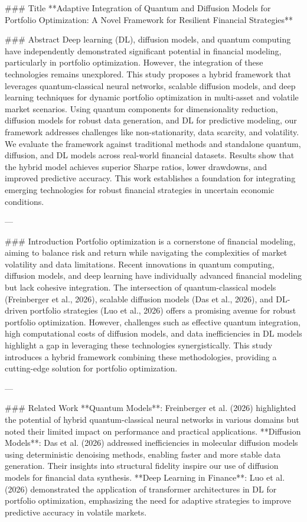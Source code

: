 ### Title  
**Adaptive Integration of Quantum and Diffusion Models for Portfolio Optimization: A Novel Framework for Resilient Financial Strategies**

### Abstract  
Deep learning (DL), diffusion models, and quantum computing have independently demonstrated significant potential in financial modeling, particularly in portfolio optimization. However, the integration of these technologies remains unexplored. This study proposes a hybrid framework that leverages quantum-classical neural networks, scalable diffusion models, and deep learning techniques for dynamic portfolio optimization in multi-asset and volatile market scenarios. Using quantum components for dimensionality reduction, diffusion models for robust data generation, and DL for predictive modeling, our framework addresses challenges like non-stationarity, data scarcity, and volatility. We evaluate the framework against traditional methods and standalone quantum, diffusion, and DL models across real-world financial datasets. Results show that the hybrid model achieves superior Sharpe ratios, lower drawdowns, and improved predictive accuracy. This work establishes a foundation for integrating emerging technologies for robust financial strategies in uncertain economic conditions.

---

### Introduction  
Portfolio optimization is a cornerstone of financial modeling, aiming to balance risk and return while navigating the complexities of market volatility and data limitations. Recent innovations in quantum computing, diffusion models, and deep learning have individually advanced financial modeling but lack cohesive integration. The intersection of quantum-classical models (Freinberger et al., 2026), scalable diffusion models (Das et al., 2026), and DL-driven portfolio strategies (Luo et al., 2026) offers a promising avenue for robust portfolio optimization. However, challenges such as effective quantum integration, high computational costs of diffusion models, and data inefficiencies in DL models highlight a gap in leveraging these technologies synergistically. This study introduces a hybrid framework combining these methodologies, providing a cutting-edge solution for portfolio optimization.

---

### Related Work  
**Quantum Models**: Freinberger et al. (2026) highlighted the potential of hybrid quantum-classical neural networks in various domains but noted their limited impact on performance and practical applications.  
**Diffusion Models**: Das et al. (2026) addressed inefficiencies in molecular diffusion models using deterministic denoising methods, enabling faster and more stable data generation. Their insights into structural fidelity inspire our use of diffusion models for financial data synthesis.  
**Deep Learning in Finance**: Luo et al. (2026) demonstrated the application of transformer architectures in DL for portfolio optimization, emphasizing the need for adaptive strategies to improve predictive accuracy in volatile markets.

